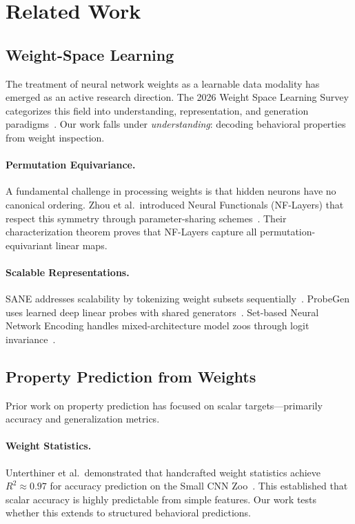 \section{Related Work}

\subsection{Weight-Space Learning}

The treatment of neural network weights as a learnable data modality has emerged as an active research direction. The 2026 Weight Space Learning Survey categorizes this field into understanding, representation, and generation paradigms~\cite{han2026survey}. Our work falls under \emph{understanding}: decoding behavioral properties from weight inspection.

\paragraph{Permutation Equivariance.} A fundamental challenge in processing weights is that hidden neurons have no canonical ordering. Zhou et al.\ introduced Neural Functionals (NF-Layers) that respect this symmetry through parameter-sharing schemes~\cite{zhou2023nf}. Their characterization theorem proves that NF-Layers capture all permutation-equivariant linear maps.

\paragraph{Scalable Representations.} SANE addresses scalability by tokenizing weight subsets sequentially~\cite{schurholt2024sane}. ProbeGen uses learned deep linear probes with shared generators~\cite{kahana2024probegen}. Set-based Neural Network Encoding handles mixed-architecture model zoos through logit invariance~\cite{andreis2023setbased}.

\subsection{Property Prediction from Weights}

Prior work on property prediction has focused on scalar targets---primarily accuracy and generalization metrics.

\paragraph{Weight Statistics.} Unterthiner et al.\ demonstrated that handcrafted weight statistics achieve $R^2 \approx 0.97$ for accuracy prediction on the Small CNN Zoo~\cite{unterthiner2020predicting}. This established that scalar accuracy is highly predictable from simple features. Our work tests whether this extends to structured behavioral predictions.

